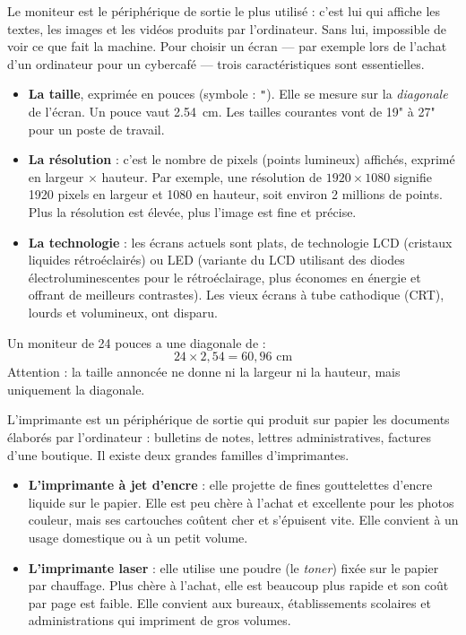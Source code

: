 \documentclass[11pt]{article}
\newcommand{\cle}[1]{{\popxbold\color{popdark}#1}}
\newcounter{popsec}
\newcounter{popsub}
\newcommand{\courssub}[1]{%
  \stepcounter{popsub}%
  \par\vspace{9pt}\noindent{\popxbold\fontsize{11.5}{13}\selectfont\color{popink}{\color{poporange}\thepopsec.\thepopsub}\hspace{6pt}#1}\par\nopagebreak\vspace{4pt}
}
\begin{document}
\courssub{Le moniteur (écran)}

Le \cle{moniteur} est le périphérique de sortie le plus utilisé : c'est lui qui affiche les textes, les images et les vidéos produits par l'ordinateur. Sans lui, impossible de voir ce que fait la machine. Pour choisir un écran — par exemple lors de l'achat d'un ordinateur pour un cybercafé — trois caractéristiques sont essentielles.

\begin{itemize}
\item \textbf{La taille}, exprimée en \cle{pouces} (symbole : \texttt{"}). Elle se mesure sur la \emph{diagonale} de l'écran. Un pouce vaut \num{2,54}~cm. Les tailles courantes vont de 19" à 27" pour un poste de travail.
\item \textbf{La résolution} : c'est le nombre de \cle{pixels} (points lumineux) affichés, exprimé en largeur $\times$ hauteur. Par exemple, une résolution de $1920 \times 1080$ signifie 1920 pixels en largeur et 1080 en hauteur, soit environ 2 millions de points. Plus la résolution est élevée, plus l'image est fine et précise.
\item \textbf{La technologie} : les écrans actuels sont plats, de technologie \cle{LCD} (cristaux liquides rétroéclairés) ou \cle{LED} (variante du LCD utilisant des diodes électroluminescentes pour le rétroéclairage, plus économes en énergie et offrant de meilleurs contrastes). Les vieux écrans à tube cathodique (CRT), lourds et volumineux, ont disparu.
\end{itemize}

\begin{exemplebox}
Un moniteur de 24 pouces a une diagonale de :
\[ 24 \times 2{,}54 = 60{,}96 \text{ cm} \]
Attention : la taille annoncée ne donne ni la largeur ni la hauteur, mais uniquement la diagonale.
\end{exemplebox}

\courssub{L'imprimante}

L'\cle{imprimante} est un périphérique de sortie qui produit sur papier les documents élaborés par l'ordinateur : bulletins de notes, lettres administratives, factures d'une boutique. Il existe deux grandes familles d'imprimantes.

\begin{itemize}
\item \textbf{L'imprimante à jet d'encre} : elle projette de fines gouttelettes d'encre liquide sur le papier. Elle est peu chère à l'achat et excellente pour les photos couleur, mais ses cartouches coûtent cher et s'épuisent vite. Elle convient à un usage domestique ou à un petit volume.
\item \textbf{L'imprimante laser} : elle utilise une poudre (le \emph{toner}) fixée sur le papier par chauffage. Plus chère à l'achat, elle est beaucoup plus rapide et son coût par page est faible. Elle convient aux bureaux, établissements scolaires et administrations qui impriment de gros volumes.
\end{itemize}
\end{document}
